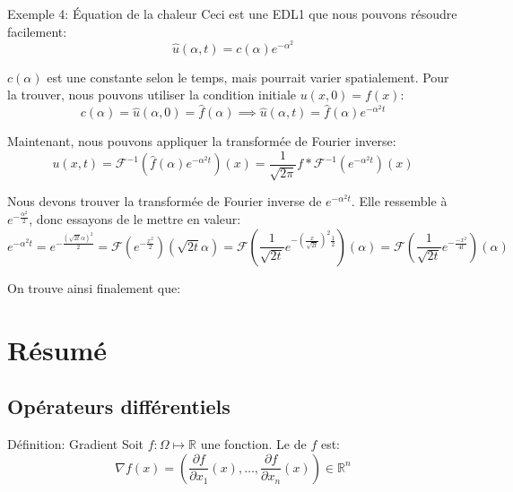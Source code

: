 \documentclass[a4paper]{article}
\begin{document}
\begin{parag}{Exemple 4: Équation de la chaleur}
    Ceci est une EDL1 que nous pouvons résoudre facilement: 
    \[\hat{u}\left(\alpha, t\right) = c\left(\alpha\right) e^{-\alpha ^2}\]

    $c\left(\alpha\right)$ est une constante selon le temps, mais pourrait varier spatialement. Pour la trouver, nous pouvons utiliser la condition initiale $u\left(x, 0\right) = f\left(x\right)$: 
    \[c\left(\alpha\right) = \hat{u}\left(\alpha, 0\right) = \hat{f}\left(\alpha\right) \implies \hat{u}\left(\alpha, t\right) = \hat{f}\left(\alpha\right) e^{-\alpha ^2 t}\]
    
    Maintenant, nous pouvons appliquer la transformée de Fourier inverse: 
    \[u\left(x, t\right) = \mathcal{F}^{-1}\left(\hat{f}\left(\alpha\right) e^{-\alpha ^2 t}\right)\left(x\right) = \frac{1}{\sqrt{2\pi}} f * \mathcal{F}^{-1}\left(e^{-\alpha ^2 t}\right)\left(x\right)\]
    
    Nous devons trouver la transformée de Fourier inverse de $e^{-\alpha ^2 t}$. Elle ressemble à $e^{-\frac{\alpha ^2}{2}}$, donc essayons de le mettre en valeur: 
    \[e^{- \alpha ^2 t} = e^{- \frac{\left(\sqrt{2t} \alpha\right)^2}{2}} = \mathcal{F}\left(e^{-\frac{x^2}{2}}\right)\left(\sqrt{2t} \alpha\right) = \mathcal{F}\left(\frac{1}{\sqrt{2t}} e^{-\left(\frac{x}{\sqrt{2t}}\right)^2 \frac{1}{2}}\right)\left(\alpha\right) = \mathcal{F}\left(\frac{1}{\sqrt{2t}} e^{-\frac{-x^2}{4t}}\right)\left(\alpha\right)\]

    On trouve ainsi finalement que: 
\end{parag}

\section{Résumé}
\subsection{Opérateurs différentiels}
\begin{parag}{Définition: Gradient}
    Soit $f: \Omega \mapsto \mathbb{R}$ une fonction. Le  de $f$ est: 
    \[\nabla f\left(x\right) = \left(\frac{\partial f}{\partial x_1} \left(x\right), \ldots, \frac{\partial f}{\partial x_n} \left(x\right)\right) \in \mathbb{R}^n\]
\end{parag}
\end{document}
